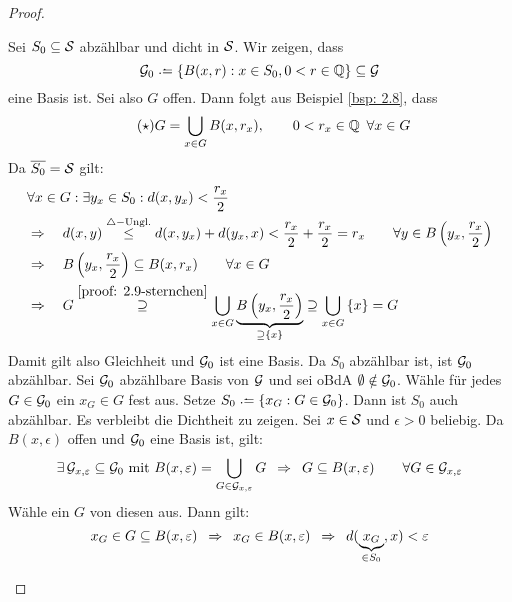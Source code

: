 \begin{proof}
	\begin{equivalence}
		\hinrichtung Sei $S_0\subseteq \S$ abzählbar und dicht in $\S$. Wir zeigen, dass
		\begin{equation*}
			\G_0 \defeq \menge{ B(x,r) : x \in S_0 , 0 < r \in \Q}\subseteq \G
		\end{equation*}
		eine Basis ist.
		Sei also $G$ offen. Dann folgt aus Beispiel \cref{bsp: 2.8}, dass
		\begin{equation} \label{proof: 2.9-sternchen} \tag{$\star$}
			G = \bigcup_{x \in G} B(x,r_x), \qquad 0 < r_x \in\Q \enskip \forall x \in G
		\end{equation}
		Da $\quer{S_0} = \S$ gilt:
		\begin{align*}
			&\forall x \in G:\exists y_x \in S_0: d(x,y_x) < \frac{r_x}{2} \\
			&\Rightarrow \quad d(x,y)
			\overset{\triangle-\text{Ungl.}}{\le}
			d(x,y_x) + d(y_x,x) < \frac{r_x}{2} + \frac{r_x}{2} = r_x
			\qquad \forall y \in B\brackets{y_x,\frac{r_x}{2}} \\
			&\Rightarrow \quad B\brackets{y_x,\frac{r_x}{2}} \subseteq B(x,r_x)
			\qquad \forall x \in G \\
			&\Rightarrow \quad G \overset{\eqref{proof: 2.9-sternchen}}{\supseteq}
			\bigcup_{x \in G} \underbrace{ B\brackets{y_x,\frac{r_x}{2}} }_{\supseteq \menge{x}}
			\supseteq \bigcup_{x \in G} \menge{x} = G %
		\end{align*}
		Damit gilt also Gleichheit und $\G_0$ ist eine Basis. Da $S_0$ abzählbar ist, ist $\G_0$ abzählbar. 
		\rueckrichtung Sei $\G_0$ abzählbare Basis von $\G$ und sei oBdA $\emptyset \notin \G_0$. Wähle für jedes $G \in \G_0$ ein $x_G \in G$ fest aus. Setze
		$S_0 \defeq \menge{x_G : G \in \G_0}$. Dann ist $S_0$ auch abzählbar. Es verbleibt die Dichtheit zu zeigen.
		Sei $x \in \S$ und $\epsilon > 0$ beliebig. Da $B(x,\epsilon)$ offen und $\G_0$ eine Basis ist, gilt:
		\begin{equation*}
			\exists \, \G_{x,\epsilon}\subseteq\G_0\mit B(x,\epsilon)=\bigcup_{G\in\G_{x,\epsilon}} G
			\follows  G\subseteq B(x,\epsilon)\qquad\forall G\in\G_{x,\epsilon}
		\end{equation*}
		Wähle ein $G$ von diesen aus. Dann gilt:
		\begin{equation*}
			x_G \in G \subseteq B(x,\epsilon)
			\follows  x_G\in B(x,\epsilon)
			\follows  d(\underbrace{x_G}_{\in S_0},x) < \epsilon
		\end{equation*}
	\end{equivalence}	
\end{proof}

